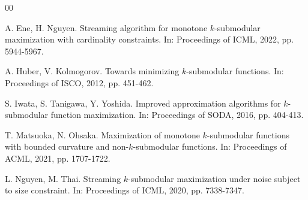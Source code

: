 \documentclass[preprint,12pt]{elsarticle}
\begin{document}
\begin{thebibliography}{00}




%
%







A. Ene, H. Nguyen.
Streaming algorithm for monotone $k$-submodular maximization with cardinality constraints.
In: Proceedings of ICML, 2022, pp. 5944-5967.

A. Huber, V. Kolmogorov.
Towards minimizing $k$-submodular functions.
In: Proceedings of ISCO, 2012, pp. 451-462.

S. Iwata, S. Tanigawa, Y. Yoshida.
Improved approximation algorithms for $k$-submodular function maximization.
In: Proceedings of SODA, 2016, pp. 404-413.



T. Matsuoka, N. Ohsaka.
Maximization of monotone $k$-submodular functions with bounded curvature and non-$k$-submodular functions.
In: Proceedings of ACML, 2021, pp. 1707-1722.


L. Nguyen, M. Thai.
Streaming $k$-submodular maximization under noise subject to size constraint.
In: Proceedings of ICML, 2020, pp. 7338-7347.



\end{thebibliography}
\end{document}

